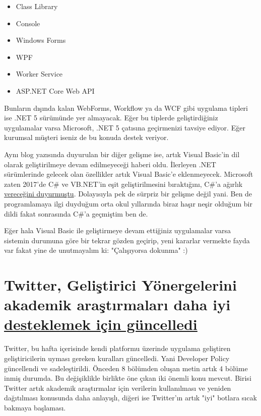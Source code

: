 \documentclass[11pt]{article}
\begin{document}
\begin{itemize}
\item Class Library
\item Console
\item Windows Forms
\item WPF
\item Worker Service
\item ASP.NET Core Web API
\end{itemize}

Bunların dışında kalan WebForms, Workflow ya da WCF gibi uygulama tipleri ise
.NET 5 sürümünde yer almayacak. Eğer bu tiplerde geliştirdiğiniz uygulamalar
varsa Microsoft, .NET 5 çatısına geçirmenizi tavsiye ediyor. Eğer kurumsal
müşteri iseniz de bu konuda destek veriyor.

Aynı blog yazısında duyurulan bir diğer gelişme ise, artık Visual Basic'in dil
olarak geliştirilmeye devam edilmeyeceği haberi oldu. İlerleyen .NET
sürümlerinde gelecek olan özellikler artık Visual Basic'e eklenmeyecek.
Microsoft zaten 2017'de C\# ve VB.NET'in eşit geliştirilmesini bıraktığını,
C\#'a ağırlık \href{https://www.thurrott.com/dev/89874/microsoft-outlines-development-language-strategy}{vereceğini duyurmuştu}. Dolayısıyla pek de sürpriz bir gelişme
değil yani. Ben de programlamaya ilgi duyduğum orta okul yıllarında biraz
haşır neşir olduğum bir dildi fakat sonrasında C\#'a geçmiştim ben de.

Eğer hala Visual Basic ile geliştirmeye devam ettiğiniz uygulamalar varsa
sistemin durumuna göre bir tekrar gözden geçirip, yeni kararlar vermekte fayda
var fakat yine de unutmayalım ki: "Çalışıyorsa dokunma" :)
\section{Twitter, Geliştirici Yönergelerini akademik araştırmaları daha iyi \href{https://techcrunch.com/2020/03/10/twitter-rewrites-developer-policy-to-better-support-academic-research-and-use-of-good-bots/}{desteklemek için güncelledi}}
\label{sec:org2b5d74c}
Twitter, bu hafta içerisinde kendi platformu üzerinde uygulama geliştiren
geliştiricilerin uyması gereken kuralları güncelledi. Yani Developer Policy
güncellendi ve sadeleştirildi. Önceden 8 bölümden oluşan metin artık 4 bölüme
inmiş durumda. Bu değişiklikle birlikte öne çıkan iki önemli konu mevcut.
Birisi Twitter artık akademik araştırmalar için verilerin kullanılması ve
yeniden dağıtılması konusunda daha anlayışlı, diğeri ise Twitter'ın artık
"iyi" botlara sıcak bakmaya başlaması.
\end{document}
